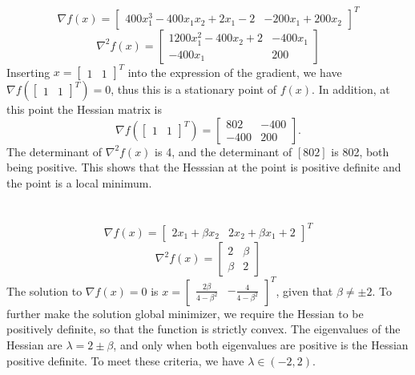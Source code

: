 \documentclass[11pt]{article}
\begin{document}
\section{}
$$\nabla f(x)=\begin{bmatrix} 400x_1^3-400x_1x_2+2x_1-2 & -200x_1+200x_2\end{bmatrix}^T$$
$$\nabla ^2f(x)=\begin{bmatrix} 1200x_1^2-400x_2+2 & -400x_1\\ -400x_1 &200\end{bmatrix} $$
Inserting $x=\begin{bmatrix} 1 & 1\end{bmatrix}^T $ into the expression of the gradient, we have $\nabla f(\begin{bmatrix} 1&1\end{bmatrix}^T )=0$, thus this is a stationary point of $f(x)$. In addition, at this point the Hessian matrix is $$\nabla f(\begin{bmatrix} 1 & 1\end{bmatrix}^T ) = \begin{bmatrix} 802 & -400 \\ -400 & 200\end{bmatrix} .$$ The determinant of $\nabla ^2f(x)$ is 4, and the determinant of $[802]$ is 802, both being positive. This shows that the Hesssian at the point is positive definite and the point is a local minimum. 
\section{}
$$\nabla f(x)=\begin{bmatrix}2x_1+\beta x_2 & 2x_2+\beta x_1+2\end{bmatrix}^T$$ $$\nabla^2f(x)=\begin{bmatrix}2 & \beta \\ \beta & 2 \end{bmatrix}$$
The solution to $\nabla f(x)=0$ is $x=\begin{bmatrix} \frac{2\beta}{4-\beta^2} & -\frac{4}{4-\beta^2} \end{bmatrix}^T$, given that $\beta\neq\pm2$. To further make the solution global minimizer, we require the Hessian to be positively definite, so that the function is strictly convex. The eigenvalues of the Hessian are $\lambda=2\pm\beta$, and only when both eigenvalues are positive is the Hessian positive definite. To meet these criteria, we have $\lambda\in(-2,2)$.
\end{document}

